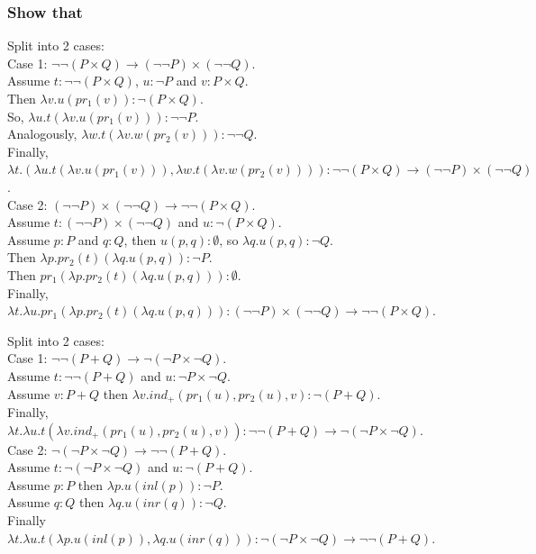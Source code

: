 \documentclass{article}
\begin{document}
\subsubsection{Show that}
Split into 2 cases:\\
Case 1: $\lnot\lnot(P \times Q) \to (\lnot\lnot P) \times (\lnot\lnot Q)$.\\
Assume $t:\lnot\lnot(P \times Q)$, $u:\lnot P$ and $v:P \times Q$.\\
Then $\lambda v.u(pr_1(v)):\lnot(P \times Q)$.\\
So, $\lambda u.t(\lambda v.u(pr_1(v))):\lnot\lnot P$.\\
Analogously, $\lambda w.t(\lambda v.w(pr_2(v))):\lnot\lnot Q$.\\
Finally, $\lambda t.(\lambda u.t(\lambda v.u(pr_1(v))),\lambda w.t(\lambda v.w(pr_2(v)))):\lnot\lnot(P \times Q) \to (\lnot\lnot P) \times (\lnot\lnot Q)$.\\
Case 2: $(\lnot\lnot P) \times (\lnot\lnot Q) \to \lnot\lnot(P \times Q)$.\\
Assume $t:(\lnot\lnot P) \times (\lnot\lnot Q)$ and $u:\lnot(P \times Q)$.\\
Assume $p:P$ and $q:Q$, then $u(p,q):\emptyset$, so $\lambda q.u(p, q):\lnot Q$.\\
Then $\lambda p.pr_2(t)(\lambda q.u(p, q)):\lnot P$.\\
Then $pr_1(\lambda p.pr_2(t)(\lambda q.u(p, q))):\emptyset$.\\
Finally, $\lambda t.\lambda u.pr_1(\lambda p.pr_2(t)(\lambda q.u(p, q))):(\lnot\lnot P) \times (\lnot\lnot Q) \to \lnot\lnot(P \times Q)$.\\

\vspace{1em}\par
Split into 2 cases:\\
Case 1: $\lnot\lnot(P + Q) \to \lnot(\lnot P \times \lnot Q)$.\\
Assume $t:\lnot\lnot(P + Q)$ and $u:\lnot P \times \lnot Q$.\\
Assume $v:P + Q$ then $\lambda v.ind_+(pr_1(u),pr_2(u),v):\lnot(P + Q)$.\\
Finally, $\lambda t.\lambda u.t(\lambda v.ind_+(pr_1(u),pr_2(u),v)):\lnot\lnot(P + Q) \to \lnot(\lnot P \times \lnot Q)$.\\
Case 2: $\lnot(\lnot P \times \lnot Q) \to \lnot\lnot(P + Q)$.\\
Assume $t:\lnot(\lnot P \times \lnot Q)$ and $u:\lnot(P + Q)$.\\
Assume $p:P$ then $\lambda p.u(inl(p)):\lnot P$.\\
Assume $q:Q$ then $\lambda q.u(inr(q)):\lnot Q$.\\
Finally $\lambda t.\lambda u.t(\lambda p.u(inl(p)), \lambda q.u(inr(q))):\lnot(\lnot P \times \lnot Q) \to \lnot\lnot(P + Q)$.\\
\end{document}
